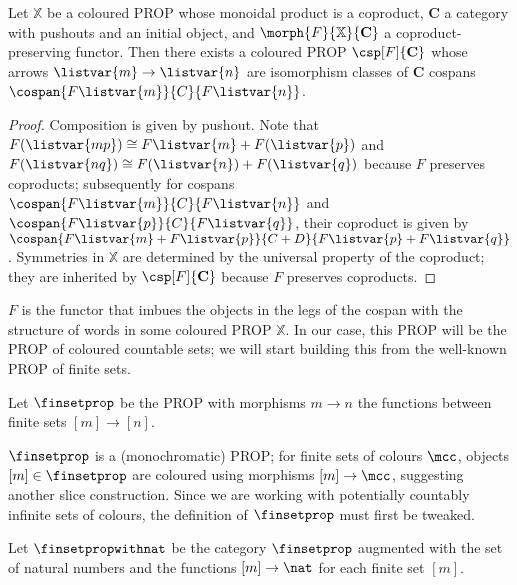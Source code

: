 \begin{theorem}
    Let \(\mathbb{X}\) be a coloured PROP whose monoidal product is a coproduct,
    \(\mathbf{C}\) a category with pushouts and an initial object, and \(
        \morph{F}{\mathbb{X}}{\mathbf{C}}
    \) a coproduct-preserving functor.
    Then there exists a coloured PROP \(\csp[F]{\mathbf{C}}\) whose arrows
    \(\listvar{m} \to \listvar{n}\) are isomorphism classes of \(\mathbf{C}\)
    cospans \(\cospan{F\listvar{m}}{C}{F\listvar{n}}\).
\end{theorem}
\begin{proof}
    Composition is given by pushout.
    Note that \(F(\listvar{mp}) \cong F\listvar{m} + F(\listvar{p})\) and
    \(F(\listvar{nq}) \cong F(\listvar{n}) + F(\listvar{q})\) because \(F\)
    preserves coproducts; subsequently for cospans
    \(\cospan{F\listvar{m}}{C}{F\listvar{n}}\) and
    \(\cospan{F\listvar{p}}{C}{F\listvar{q}}\), their
    coproduct is given by \(
        \cospan{F\listvar{m} + F\listvar{p}}{C + D}{F\listvar{p} + F\listvar{q}}
    \).
    Symmetries in \(\mathbb{X}\) are determined by the universal property of
    the coproduct; they are inherited by \(\csp[F]{\mathbf{C}}\) because \(F\)
    preserves coproducts.
\end{proof}

\(F\) is the functor that imbues the objects in the legs of the cospan with the
structure of words in some coloured PROP \(\mathbb{X}\).
In our case, this PROP will be the PROP of coloured countable sets; we will
start building this from the well-known PROP of finite sets.

\begin{definition}
    Let \(\finsetprop\) be the PROP with morphisms \(m \to n\) the functions
    between finite sets \([m] \to [n]\).
\end{definition}

\(\finsetprop\) is a (monochromatic) PROP; for finite sets of colours \(\mcc\),
objects \([m] \in \finsetprop\) are coloured using morphisms \([m] \to \mcc\),
suggesting another slice construction.
Since we are working with potentially countably infinite sets of colours, the
definition of \(\finsetprop\) must first be tweaked.

\begin{definition}
    Let \(\finsetpropwithnat\) be the category \(\finsetprop\) augmented with the
    set of natural numbers and the functions \([m] \to \nat\) for each finite
    set \([m]\).
\end{definition}

